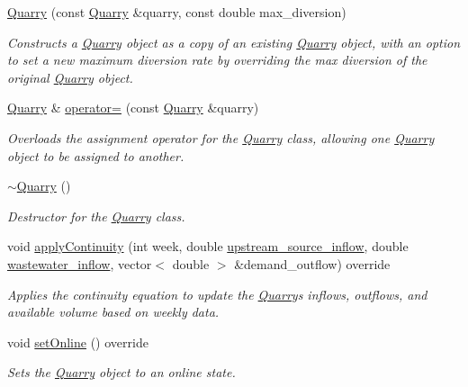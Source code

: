 \begin{DoxyCompactItemize}
\mbox{\hyperlink{classQuarry_a5a43f5a3f1cb837bc313046cf82b49e3}{Quarry}} (const \mbox{\hyperlink{classQuarry}{Quarry}} \&quarry, const double max\+\_\+diversion)
\begin{DoxyCompactList}\small\item\em Constructs a \mbox{\hyperlink{classQuarry}{Quarry}} object as a copy of an existing \mbox{\hyperlink{classQuarry}{Quarry}} object, with an option to set a new maximum diversion rate by overriding the max diversion of the original \mbox{\hyperlink{classQuarry}{Quarry}} object. \end{DoxyCompactList}\item 
\mbox{\hyperlink{classQuarry}{Quarry}} \& \mbox{\hyperlink{classQuarry_adc3df376f620f8337b5dbf0868cf7fb6}{operator=}} (const \mbox{\hyperlink{classQuarry}{Quarry}} \&quarry)
\begin{DoxyCompactList}\small\item\em Overloads the assignment operator for the \mbox{\hyperlink{classQuarry}{Quarry}} class, allowing one \mbox{\hyperlink{classQuarry}{Quarry}} object to be assigned to another. \end{DoxyCompactList}\item 
\mbox{\hyperlink{classQuarry_a6c528c6222e8e5adc134db5cafbe62e3}{$\sim$\+Quarry}} ()
\begin{DoxyCompactList}\small\item\em Destructor for the \mbox{\hyperlink{classQuarry}{Quarry}} class. \end{DoxyCompactList}\item 
void \mbox{\hyperlink{classQuarry_a6999b854a740ce92baaa610cf5b08bd9}{apply\+Continuity}} (int week, double \mbox{\hyperlink{classWaterSource_a7a69b2e9b6030f1035e6cf44d2918ee5}{upstream\+\_\+source\+\_\+inflow}}, double \mbox{\hyperlink{classWaterSource_aeb5a2d2d83383a70ca20f3e94635a9c7}{wastewater\+\_\+inflow}}, vector$<$ double $>$ \&demand\+\_\+outflow) override
\begin{DoxyCompactList}\small\item\em Applies the continuity equation to update the \mbox{\hyperlink{classQuarry}{Quarry}}\textquotesingle{}s inflows, outflows, and available volume based on weekly data. \end{DoxyCompactList}\item 
void \mbox{\hyperlink{classQuarry_af5fe04fa188d399485b2b4e64381e169}{set\+Online}} () override
\begin{DoxyCompactList}\small\item\em Sets the \mbox{\hyperlink{classQuarry}{Quarry}} object to an online state. \end{DoxyCompactList}\end{DoxyCompactItemize}
